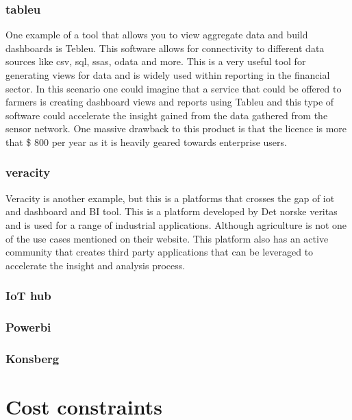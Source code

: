 \documentclass[]{uiophd}
\begin{document}
\subsection{tableu}
One example of a tool that allows you to view aggregate data and build dashboards is Tebleu. This software allows for connectivity to different data sources like csv, sql, ssas, odata and more. This is a very useful tool for generating views for data and is widely used within reporting in the financial sector. In this scenario one could imagine that a service that could be offered to farmers is creating dashboard views and reports using Tableu and  this type of software could accelerate the insight gained from the data gathered from the sensor network. One massive drawback to this product is that the licence is more that \$ 800 per year as it is heavily geared towards enterprise users.

\subsection{veracity}
Veracity is another example, but this is a platforms that crosses the gap of iot and dashboard and BI tool. This is a platform developed by Det norske veritas and is used for a range of industrial applications. Although agriculture is not one of the use cases mentioned on their website. This platform also has an active community that creates third party applications that can be leveraged to accelerate the insight and analysis process. 

\subsection{IoT hub}

\subsection{Powerbi}

\subsection{Konsberg}

\chapter{Cost constraints}
\end{document}
